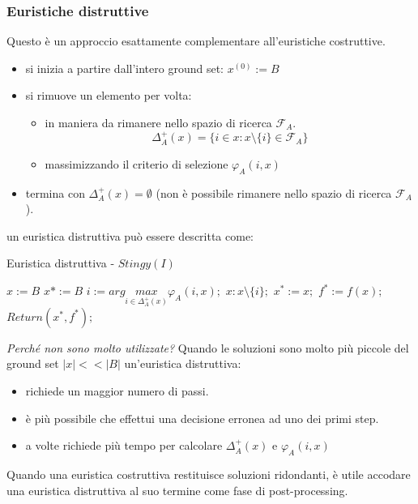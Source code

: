 \documentclass{article}
\begin{document}
\subsubsection{Euristiche distruttive}
Questo è un approccio esattamente complementare all'euristiche costruttive.
\begin{itemize}
    \item si inizia a partire dall'intero ground set: $x^{(0)}:=B$
    \item si rimuove un elemento per volta:
          \begin{itemize}
              \item in maniera da rimanere nello spazio di ricerca $\mathcal{F}_A$.
                    $$\Delta_A^+(x)=\{i\in x:x\setminus\{i\}\in\mathcal{F}_A\}$$
              \item massimizzando il criterio di selezione $\varphi_A(i,x)$
          \end{itemize}
    \item termina con $\Delta_A^+(x)=\emptyset$ (non è possibile rimanere nello spazio di ricerca $\mathcal{F}_A$).
\end{itemize}
un euristica distruttiva può essere descritta come:

\begin{algorithm}[H]
    \caption{Euristica distruttiva - $Stingy(I)$}
    \begin{algorithmic}
        \State $x:=B$
        \State $x*:=B$
        \Else
        \EndIf
        \State $i:=arg\underset{i \in \Delta_A^+(x)}{max}\varphi_A(i,x);$
        \State $x:x\setminus\{i\};$
        \EndWhile
        \State $x^*:=x;$
        \State $f^*:=f(x);$
        \EndIf
        \State $Return(x^*,f^*);$
    \end{algorithmic}
\end{algorithm}

\textit{Perché non sono molto utilizzate?} Quando le soluzioni sono molto più piccole del ground set
$|x|<<|B|$ un'euristica distruttiva:
\begin{itemize}
    \item richiede un maggior numero di passi.
    \item è più possibile che effettui una decisione erronea ad uno dei primi step.
    \item a volte richiede più tempo per calcolare $\Delta_A^+(x)$ e $\varphi_A(i,x)$
\end{itemize}
Quando una euristica costruttiva restituisce soluzioni ridondanti, è utile accodare una euristica
distruttiva al suo termine come fase di post-processing.
\end{document}
